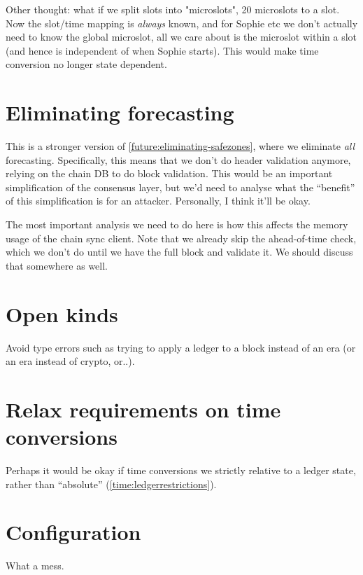 Other thought: what if we split slots into "microslots", 20 microslots to a
slot. Now the slot/time mapping is \emph{always} known, and for Sophie etc
we don't actually need to know the global microslot, all we care about is
the microslot within a slot (and hence is independent of when Sophie starts).
This would make time conversion no longer state dependent.

\section{Eliminating forecasting}
\label{future:eliminating-forecasting}

This is a stronger version of \cref{future:eliminating-safezones}, where
we eliminate \emph{all} forecasting. Specifically, this means that we don't
do header validation anymore, relying on the chain DB to do block validation.
This would be an important simplification of the consensus layer, but we'd
need to analyse what the ``benefit'' of this simplification is for an
attacker. Personally, I think it'll be okay.

The most important analysis we need to do here is how this affects the memory
usage of the chain sync client. Note that we already skip the ahead-of-time
check, which we don't do until we have the full block and validate it. We
should discuss that somewhere as well.

\section{Open kinds}
\label{future:openkinds}

Avoid type errors such as trying to apply a ledger to a block instead of an era
(or an era instead of crypto, or..).

\section{Relax requirements on time conversions}
\label{future:relax-time-requirements}

Perhaps it would be okay if time conversions we strictly relative to a ledger
state, rather than ``absolute'' (\cref{time:ledgerrestrictions}).

\section{Configuration}

What a mess.

